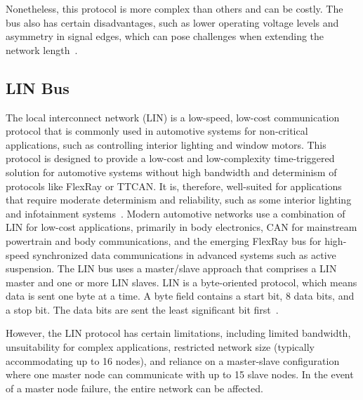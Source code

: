     Nonetheless, this protocol is more complex than others and can be costly. The bus also has certain disadvantages, such as lower operating voltage levels and asymmetry in signal edges, which can pose challenges when extending the network length~\cite{Flexray}.


    \subsection{LIN Bus}
    
    The local interconnect network (LIN) is a low-speed, low-cost communication protocol that is commonly used in automotive systems for non-critical applications, such as controlling interior lighting and window motors. %
    This protocol is designed to provide a low-cost and low-complexity time-triggered solution for automotive systems without high bandwidth and determinism of protocols like FlexRay or TTCAN. It is, therefore, well-suited for applications that require moderate determinism and reliability, such as some interior lighting and infotainment systems~\cite{denuto2001lin}.
    Modern automotive networks use a combination of LIN for low-cost applications, primarily in body electronics, CAN for mainstream powertrain and body communications, and the emerging FlexRay bus for high-speed synchronized data communications in advanced systems such as active suspension. The LIN bus uses a master/slave approach that comprises a LIN master and one or more LIN slaves. LIN is a byte-oriented protocol, which means data is sent one byte at a time. A byte field contains a start bit, 8 data bits, and a stop bit. The data bits are sent the least significant bit first~\cite{LIN}. 
    
    However, the LIN protocol has certain limitations, including limited bandwidth, unsuitability for complex applications, restricted network size (typically accommodating up to 16 nodes), and reliance on a master-slave configuration where one master node can communicate with up to 15 slave nodes. In the event of a master node failure, the entire network can be affected.

